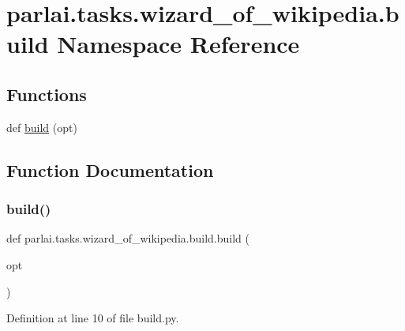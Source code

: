 \hypertarget{namespaceparlai_1_1tasks_1_1wizard__of__wikipedia_1_1build}{}\section{parlai.\+tasks.\+wizard\+\_\+of\+\_\+wikipedia.\+build Namespace Reference}
\label{namespaceparlai_1_1tasks_1_1wizard__of__wikipedia_1_1build}
\subsection*{Functions}
\begin{DoxyCompactItemize}
\item 
def \hyperlink{namespaceparlai_1_1tasks_1_1wizard__of__wikipedia_1_1build_a9675cda9046b7287141b050272699984}{build} (opt)
\end{DoxyCompactItemize}


\subsection{Function Documentation}
\mbox{\label{namespaceparlai_1_1tasks_1_1wizard__of__wikipedia_1_1build_a9675cda9046b7287141b050272699984}} 
\subsubsection{\texorpdfstring{build()}{build()}}
{\footnotesize\ttfamily def parlai.\+tasks.\+wizard\+\_\+of\+\_\+wikipedia.\+build.\+build (\begin{DoxyParamCaption}\item[{}]{opt }\end{DoxyParamCaption})}



Definition at line 10 of file build.\+py.

